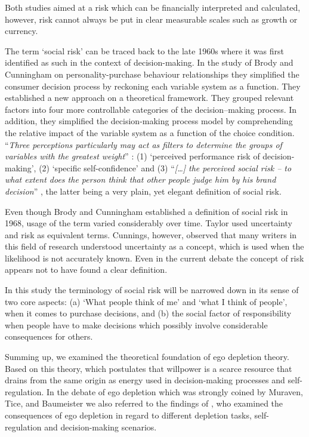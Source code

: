 Both studies aimed at a risk which can be financially interpreted and calculated, however, risk cannot always be put in clear measurable scales such as growth or currency.\par
The term ‘social risk’ can be traced back to the late 1960s where it was first identified as such in the context of decision-making. In the study of Brody and Cunningham \citep{brody1968personality} on personality-purchase behaviour relationships they simplified the consumer decision process by reckoning each variable system as a function. They established a new approach on a theoretical framework. They grouped relevant factors into four more controllable categories of the decision–making process.  In addition, they simplified the decision-making process model by comprehending the relative impact of the variable system as a function of the choice condition. “\emph{Three perceptions particularly may act as filters to determine the groups of variables with the greatest weight}” \citep{brody1968personality}: (1) ‘perceived performance risk of decision-making’, (2) ‘specific self-confidence’ and (3) “\emph{[\ldots] the perceived social risk – to what extent does the person think that other people judge him by his brand decision}” \citep[p.~51]{brody1968personality}, the latter being a very plain, yet elegant definition of social risk.\par
Even though Brody and Cunningham established a definition of social risk in 1968, usage of the term varied considerably over time. Taylor \citep{taylor1974role} used uncertainty and risk as equivalent terms. Cunnings, however, observed that many writers in this field of research understood uncertainty as a concept, which is used when the likelihood is not accurately known. Even in the current debate the concept of risk appears not to have found a clear definition.\par
In this study the terminology of social risk will be narrowed down in its sense of two core aspects: (a) ‘What people think of me’ and ‘what I think of people’, when it comes to purchase decisions, and (b) the social factor of responsibility when people have to make decisions which possibly involve considerable consequences for others.\par
Summing up, we examined the theoretical foundation of ego depletion theory. Based on this theory, which postulates that willpower is a scarce resource that drains from the same origin as energy used in decision-making processes and self-regulation. In the debate of ego depletion which was strongly coined by Muraven, Tice, and Baumeister we also referred to the findings of \citep{vohs2000self,pocheptsova2009deciding,bruyneel2009felt}, who examined the consequences of ego depletion in regard to different depletion tasks, self-regulation and decision-making scenarios.\par
